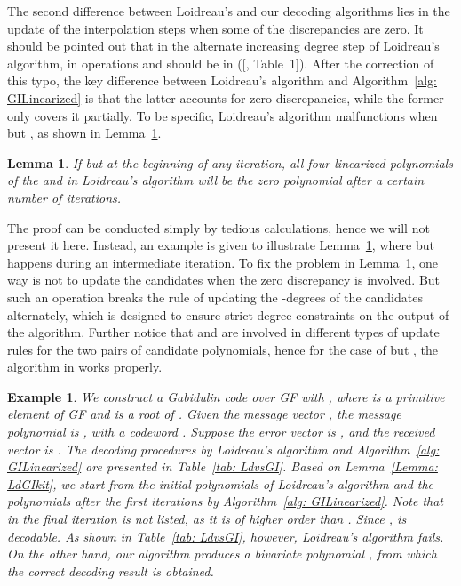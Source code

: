 \documentclass[11pt,onecolumn,draftcls]{IEEEtran}
\newtheorem{example}{Example}
\newtheorem{lemma}{Lemma}
\begin{document}
The second difference between Loidreau's and our decoding algorithms lies in the update of the interpolation steps when some of the discrepancies are zero. It should be pointed out that in the alternate increasing degree step of Loidreau's algorithm,  in operations  and  should be 
in\makeatletter
    \renewcommand\@cite [1]{#1}
    \makeatother ([\cite{loidreau_wcc05}, Table~1]).\makeatletter
    \renewcommand\@cite [1] {[#1]}
    \makeatother
After the correction of this typo, the key difference between Loidreau's algorithm and Algorithm~\ref{alg: GILinearized} is that the latter accounts for zero discrepancies, while the former only covers it partially. To be specific, Loidreau's algorithm\makeatletter
    \renewcommand\@cite [1]{#1}
    \makeatletter
    \renewcommand\@cite [1] {[#1]}
    \makeatother
malfunctions when  but , as shown in Lemma~\ref{lemma: Ldzero}.
\begin{lemma} \label{lemma: Ldzero}
If  but  at the beginning of any iteration, all four linearized polynomials of the  and  in Loidreau's algorithm will be the zero polynomial after a certain number of iterations.
\end{lemma}
The proof can be conducted simply by tedious calculations, hence we will not present it here. Instead, an example is given to illustrate Lemma~\ref{lemma: Ldzero}, where  but  happens during an intermediate iteration. To fix the problem in Lemma~\ref{lemma: Ldzero}, one way is not to update the candidates when the zero discrepancy is involved. But such an operation breaks the rule of updating the -degrees of the candidates alternately, which is designed to ensure strict degree constraints on the output of the algorithm. Further notice that  and  are involved in different types of update rules for the two pairs of candidate polynomials, hence for the case of  but , the algorithm in\makeatletter
    \renewcommand\@cite [1]{#1}
    \makeatletter
    \renewcommand\@cite [1] {[#1]}
    \makeatother works properly.

\begin{example} \label{example: 2szeros}
We construct a  Gabidulin code over GF with , where  is a primitive element of GF and is a root of . Given the message vector , the message polynomial is , with a codeword . Suppose the error vector is , and the received vector is . The decoding procedures by Loidreau's algorithm and Algorithm~\ref{alg: GILinearized} are presented in Table~\ref{tab: LdvsGI}. Based on Lemma~\ref{Lemma: LdGIkit}, we start from the initial polynomials of Loidreau's algorithm and the polynomials after the first  iterations by Algorithm~\ref{alg: GILinearized}. Note that  in the final iteration is not listed, as it is of higher order than . Since ,  is decodable. As shown in Table~\ref{tab: LdvsGI}, however, Loidreau's algorithm fails. On the other hand, our algorithm produces a bivariate polynomial , from which the correct decoding result  is obtained.
\end{example}
\end{document}

